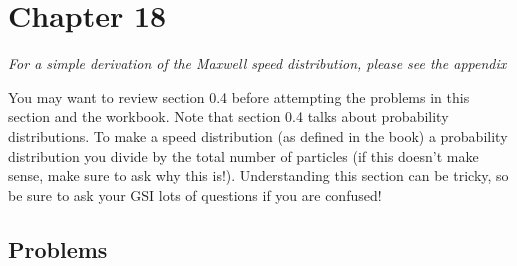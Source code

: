 \documentclass[12pt]{book}
\begin{document}
                                                                                                                                                                                                              \section{Chapter 18}                                                                                                                                                                                                            {\it For a simple derivation of the Maxwell speed distribution, please see the appendix}

You may want to review section 0.4 before attempting the problems in this section and the workbook. Note that section 0.4 talks about probability distributions. To make a speed distribution (as defined in the book) a probability distribution you divide by the total number of particles (if this doesn't make sense, make sure to ask why this is!). Understanding this section can be tricky, so be sure to ask your GSI lots of questions if you are confused!                                                                                                                                                                                         
                                                                                                                                                                                                              
\subsection{Problems}
\end{document}
